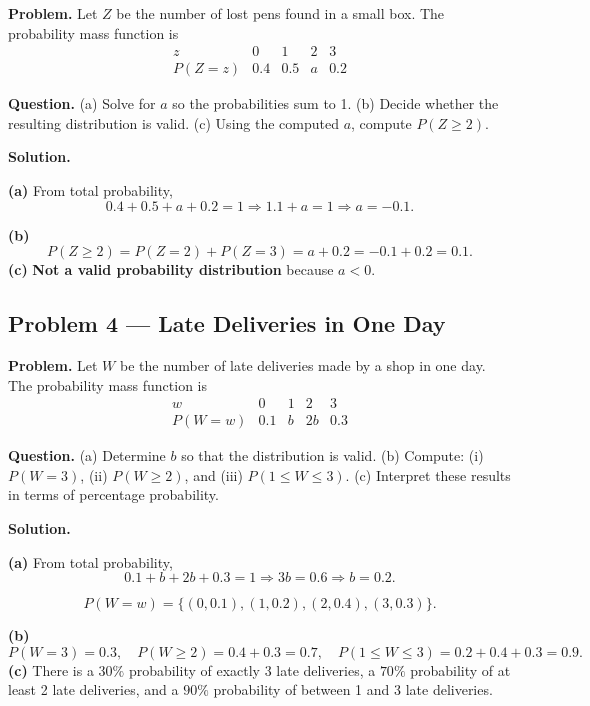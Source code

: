 \begin{ExamProblems}
		\textbf{Problem.}
		Let $Z$ be the number of lost pens found in a small box. The probability mass function is
		\[
		\begin{array}{c|cccc}
			z & 0 & 1 & 2 & 3\\
			\hline
			P(Z=z) & 0.4 & 0.5 & a & 0.2
		\end{array}
		\]
		
		\textbf{Question.}
		(a) Solve for $a$ so the probabilities sum to 1.
		(b) Decide whether the resulting distribution is valid.
		(c) Using the computed $a$, compute $P(Z\ge 2)$.
		
		\textbf{Solution.}

		\textbf{(a)} From total probability,
		\[
		0.4+0.5+a+0.2=1\Rightarrow 1.1+a=1\Rightarrow a=-0.1.
		\]
		

		\textbf{(b)}
		\[
		P(Z\ge 2)=P(Z=2)+P(Z=3)=a+0.2=-0.1+0.2=0.1.
		\]
		\textbf{(c)} \textbf{Not a valid probability distribution} because $a<0$.

		
		
		\item
		\subsection*{Problem 4 — Late Deliveries in One Day}
		
		\textbf{Problem.}
		Let $W$ be the number of late deliveries made by a shop in one day. The probability mass function is
		\[
		\begin{array}{c|cccc}
			w & 0 & 1 & 2 & 3\\
			\hline
			P(W=w) & 0.1 & b & 2b & 0.3
		\end{array}
		\]
		
		\textbf{Question.}
		(a) Determine $b$ so that the distribution is valid.
		(b) Compute: (i) $P(W=3)$, (ii) $P(W\ge 2)$, and (iii) $P(1\le W\le 3)$.
		(c) Interpret these results in terms of percentage probability.
		
		\textbf{Solution.}

		\textbf{(a)} From total probability,
		\[
		0.1+b+2b+0.3=1\Rightarrow 3b=0.6\Rightarrow b=0.2.
		\]

		
\[
		P(W=w)=\{(0,0.1),(1,0.2),(2,0.4),(3,0.3)\}.
		\]
\begin{center}
		\end{center}
\textbf{(b)}
		\[
		P(W=3)=0.3,\quad
		P(W\ge 2)=0.4+0.3=0.7,\quad
		P(1\le W\le 3)=0.2+0.4+0.3=0.9.
		\]
		\textbf{(c)} There is a $30\%$ probability of exactly 3 late deliveries, a $70\%$ probability of at least 2 late deliveries, and a $90\%$ probability of between 1 and 3 late deliveries.
		

\end{ExamProblems}

